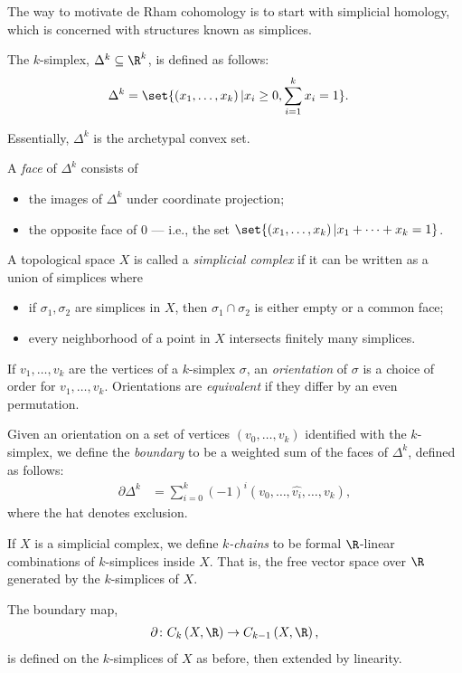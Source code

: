 \documentclass[10pt]{mypackage}
\begin{document}
The way to motivate de Rham cohomology is to start with simplicial homology, which is concerned with structures known as simplices.
\begin{definition}
  The $k$-simplex, $\Delta^{k}\subseteq \R^{k}$, is defined as follows:
  \begin{align*}
    \Delta^{k} &= \set{\left( x_1,\dots,x_k \right) | x_i\geq 0, \sum_{i=1}^{k}x_i = 1}.
  \end{align*}
\end{definition}  
Essentially, $\Delta^{k}$ is the archetypal convex set.
\begin{definition}
  A \textit{face} of $\Delta^{k}$ consists of
  \begin{itemize}
    \item the images of $\Delta^{k}$ under coordinate projection;
    \item the opposite face of $0$ --- i.e., the set $\set{\left( x_1,\dots,x_k \right) | x_1 + \cdots + x_k = 1}$.
  \end{itemize}
\end{definition}
\begin{definition}
  A topological space $X$ is called a \textit{simplicial complex} if it can be written as a union of simplices where
  \begin{itemize}
    \item if $\sigma_1,\sigma_2$ are simplices in $X$, then $\sigma_1\cap \sigma_2$ is either empty or a common face;
    \item every neighborhood of a point in $X$ intersects finitely many simplices.
  \end{itemize}
\end{definition}
\begin{definition}
  If $v_1,\dots,v_k$ are the vertices of a $k$-simplex $\sigma$, an \textit{orientation} of $\sigma$ is a choice of order for $v_1,\dots,v_k$. Orientations are \textit{equivalent} if they differ by an even permutation.
\end{definition}
\begin{definition}
  Given an orientation on a set of vertices $\left( v_0,\dots,v_k \right)$ identified with the $k$-simplex, we define the \textit{boundary} to be a weighted sum of the faces of $\Delta^{k}$, defined as follows:
  \begin{align*}
    \partial \Delta^{k} &= \sum_{i=0}^{k}\left( -1 \right)^{i} \left( v_0,\dots,\widehat{v_i},\dots,v_k \right),
  \end{align*}
  where the hat denotes exclusion.\newline

  If $X$ is a simplicial complex, we define \textit{$k$-chains} to be formal $\R$-linear combinations of $k$-simplices inside $X$. That is, the free vector space over $\R$ generated by the $k$-simplices of $X$.\newline

  The boundary map,
  \begin{align*}
    \partial\colon C_k\left( X,\R \right)\rightarrow C_{k-1}\left( X,\R \right),
  \end{align*}
  is defined on the $k$-simplices of $X$ as before, then extended by linearity.
\end{definition}
\end{document}
